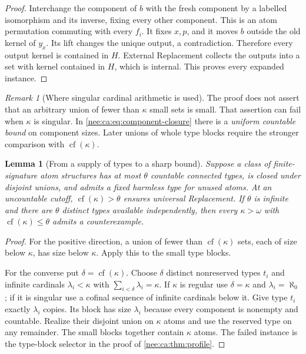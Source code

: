 \documentclass[11pt,letterpaper]{article}
\numberwithin{equation}{section}
\theoremstyle{plain}
\newtheorem{lemma}[lemma]{Lemma}
\theoremstyle{definition}
\theoremstyle{remark}
\newtheorem{remark}[remark]{Remark}
\newcommand{\cf}{\operatorname{cf}}
\begin{document}
\begin{proof}
Interchange the component of $b$ with the fresh component by a labelled isomorphism and its inverse, fixing every other component. This is an atom permutation commuting with every $f_i$. It fixes $x,p$, and it moves $b$ outside the old kernel of $y_x$. Its lift changes the unique output, a contradiction. Therefore every output kernel is contained in $H$. External Replacement collects the outputs into a set with kernel contained in $H$, which is internal. This proves every expanded instance.
\end{proof}

\begin{remark}[Where singular cardinal arithmetic is used]
The proof does not assert that an arbitrary union of fewer than $\kappa$ small sets is small. That assertion can fail when $\kappa$ is singular. In \eqref{nee:ca:eq:component-closure} there is a \emph{uniform countable bound} on component sizes. Later unions of whole type blocks require the stronger comparison with $\cf(\kappa)$.
\end{remark}

\begin{lemma}[From a supply of types to a sharp bound]\label{nee:ca:lem:type-threshold}
Suppose a class of finite-signature atom structures has at most $\theta$ countable connected types, is closed under disjoint unions, and admits a fixed harmless type for unused atoms. At an uncountable cutoff, $\cf(\kappa)>\theta$ ensures universal Replacement. If $\theta$ is infinite and there are $\theta$ distinct types available independently, then every $\kappa>\omega$ with $\cf(\kappa)\leq\theta$ admits a counterexample.
\end{lemma}
\begin{proof}
For the positive direction, a union of fewer than $\cf(\kappa)$ sets, each of size below $\kappa$, has size below $\kappa$. Apply this to the small type blocks.

For the converse put $\delta=\cf(\kappa)$. Choose $\delta$ distinct nonreserved types $t_i$ and infinite cardinals $\lambda_i<\kappa$ with $\sum_{i<\delta}\lambda_i=\kappa$. If $\kappa$ is regular use $\delta=\kappa$ and $\lambda_i=\aleph_0$; if it is singular use a cofinal sequence of infinite cardinals below it. Give type $t_i$ exactly $\lambda_i$ copies. Its block has size $\lambda_i$ because every component is nonempty and countable. Realize their disjoint union on $\kappa$ atoms and use the reserved type on any remainder. The small blocks together contain $\kappa$ atoms. The failed instance is the type-block selector in the proof of \cref{nee:ca:thm:profile}.
\end{proof}
\end{document}
